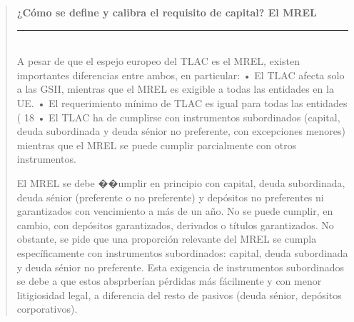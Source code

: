 \documentclass[10pt,a4paper]{article}
\newenvironment{specialblock}[1]{%
      \begin{quote} %
      \small %
      \noindent\textbf{#1}\\[-0.3em] %
      \rule{\linewidth}{0.4pt}\\[0.6em]}{
      \end{quote}}
\begin{document}
\begin{specialblock}{¿Cómo se define y calibra el requisito de capital? El MREL}
    A pesar de que el espejo europeo del TLAC es el MREL, existen importantes diferencias entre ambos, en particular:
    • El TLAC afecta solo a las GSII, mientras que el MREL es exigible a todas las entidades en la UE.
    • El requerimiento mínimo de TLAC es igual para todas las entidades ( 18%
    • El TLAC ha de cumplirse con instrumentos subordinados (capital, deuda subordinada y deuda sénior no preferente, con excepciones menores) mientras que el MREL se puede cumplir parcialmente con otros instrumentos. 

    El MREL se debe ��umplir en principio con capital, deuda subordinada, deuda sénior (preferente o no preferente) y depósitos no preferentes ni garantizados con vencimiento a más de un año. No se puede cumplir, en cambio, con depósitos garantizados, derivados o títulos garantizados. No obstante, se pide que una proporción relevante del MREL se cumpla específicamente con instrumentos subordinados: capital, deuda subordinada y deuda sénior no preferente. Esta exigencia de instrumentos subordinados se debe a que estos absprberían pérdidas más fácilmente y con menor litigiosidad legal, a diferencia del resto de pasivos (deuda sénior, depósitos corporativos).


\end{specialblock}
\end{document}
